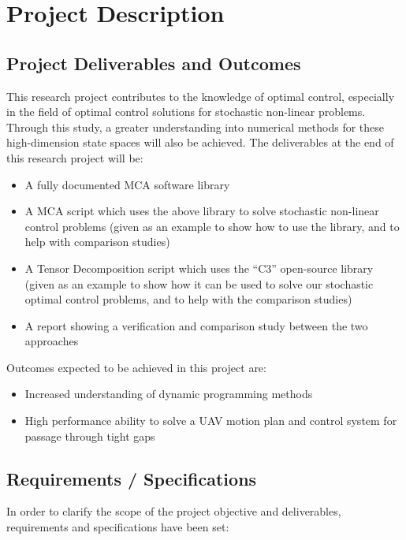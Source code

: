 \documentclass[11pt,draftd]{article}
\begin{document}
\section{Project Description}
\subsection{Project Deliverables and Outcomes}
This research project contributes to the knowledge of optimal control, especially in the field of optimal control solutions for stochastic non-linear problems. Through this study, a greater understanding into numerical methods for these high-dimension state spaces will also be achieved. 
The deliverables at the end of this research project will be:
\begin{itemize}
	\item A fully documented MCA software library
	\item A MCA script which uses the above library to solve stochastic non-linear control problems (given as an example to show how to use the library, and to help with comparison studies)
	\item A Tensor Decomposition script which uses the “C3” open-source library \cite{c3c} (given as an example to show how it can be used to solve our stochastic optimal control problems, and to help with the comparison studies)
	\item A report showing a verification and comparison study between the two approaches
\end{itemize} 

Outcomes expected to be achieved in this project are:
\begin{itemize}
	\item Increased understanding of dynamic programming methods
	\item High performance ability to solve a UAV motion plan and control system for passage through tight gaps
\end{itemize}

\subsection{Requirements / Specifications}
In order to clarify the scope of the project objective and deliverables, requirements and specifications have been set:
\end{document}
